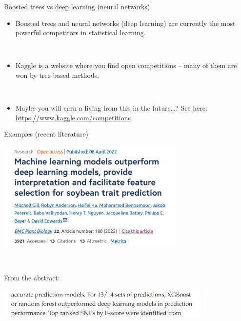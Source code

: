 \documentclass[
  10pt,
  ignorenonframetext,
]{beamer}
\providecommand{\tightlist}{%
  \setlength{\itemsep}{0pt}\setlength{\parskip}{0pt}}
\begin{document}
\begin{frame}
\begin{block}{Boosted trees vs deep learning (neural networks)}
\protect\hypertarget{boosted-trees-vs-deep-learning-neural-networks}{}
\(~\)

\begin{itemize}
\tightlist
\item
  Boosted trees and neural networks (deep learning) are currently the
  most powerful competitors in statistical learning.
\end{itemize}

\(~\)

\begin{itemize}
\tightlist
\item
  Kaggle is a website where you find open competitions -- many of them
  are won by tree-based methods.
\end{itemize}

\(~\)

\begin{itemize}
\tightlist
\item
  Maybe you will earn a living from this in the future\ldots? See
  here:\\
  \url{https://www.kaggle.com/competitions}
\end{itemize}
\end{block}
\end{frame}

\begin{frame}
\begin{block}{Examples (recent literature)}
\protect\hypertarget{examples-recent-literature}{}
\centering

\includegraphics[width=0.7\textwidth,height=\textheight]{graphics/trees_vs_nns.png}

\(~\)

\flushleft

From the abstract:

\includegraphics[width=0.8\textwidth,height=\textheight]{graphics/outperform.png}
\end{block}
\end{frame}
\end{document}
